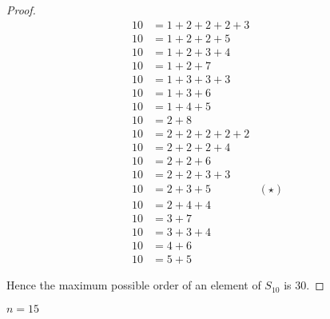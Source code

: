 \begin{proof}
\begin{align*}
        10 & = 1 + 2 + 2 + 2 + 3                               \\
        10 & = 1 + 2 + 2 + 5                                   \\
        10 & = 1 + 2 + 3 + 4                                   \\
        10 & = 1 + 2 + 7                                       \\
        10 & = 1 + 3 + 3 + 3                                   \\
        10 & = 1 + 3 + 6                                       \\
        10 & = 1 + 4 + 5                                       \\
        10 & = 2 + 8                                           \\
        10 & = 2 + 2 + 2 + 2 + 2                               \\
        10 & = 2 + 2 + 2 + 4                                   \\
        10 & = 2 + 2 + 6                                       \\
        10 & = 2 + 2 + 3 + 3                                   \\
        10 & = 2 + 3 + 5                             & (\star) \\
        10 & = 2 + 4 + 4                                       \\
        10 & = 3 + 7                                           \\
        10 & = 3 + 3 + 4                                       \\
        10 & = 4 + 6                                           \\
        10 & = 5 + 5
    \end{align*}

    Hence the maximum possible order of an element of $S_{10}$ is $30$.
\end{proof}

\newpage
\begin{exercise}
    $n = 15$
\end{exercise}

